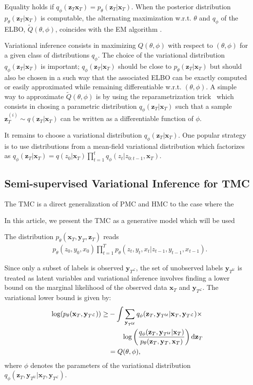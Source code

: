 \documentclass{article}
\def\x{{\mathbf x}}
\def\z{{\mathbf z}}
\def\y{{\mathbf y}}
\def\yl{{\mathbf y}_{T^{\mathcal{L}}}}
\def\yu{{\mathbf y}_{T^{\mathcal{U}}}}
\def\p{p_{\theta}}
\def\q{q_\phi}
\def\Q{\tilde{Q}}
\newcommand{\katy}[1]{\todo[size=\tiny,color=pink]{#1  \hfill --- Kat}}
\begin{document}
Equality holds if $\q(\z_T\x_T)= \p(\z_T|\x_T)$.
When the posterior distribution $\p(\z_T|\x_T)$ is  computable, the alternating 
maximization w.r.t. $\theta$ and $\q$  of the ELBO, $\Q(\theta,\phi)$,
coincides with the EM algorithm \cite{variational-EM}. 

Variational inference consists in maximizing $Q(\theta,\phi)$ 
with respect to $(\theta,\phi)$ for a given class of distributions $\q$. 
The choice of the variational distribution $\q(\z_T|\x_T)$ is important; 
$\q(\z_T|\x_T)$ should be close to $\p(\z_T|\x_T)$ but should also
be chosen in a such way that the associated ELBO can be exactly computed or 
easily approximated while remaining differentiable w.r.t. $(\theta,\phi)$. 
A simple way to approximate $\Q(\theta,\phi)$ is by using the reparametrization 
trick~\cite{kingma2013auto} which consists in chosing a parametric
distribution $\q(\z_T|\x_T)$ such that a sample $\z_T^{(i)} \sim q(\z_T|\x_T)$ can
be written as a differentiable function of $\phi$.

It remains to choose a variational distribution $\q(\z_T|\x_T)$.
One popular strategy is to use distributions from a mean-field variational 
distribution which factorizes as  $\q(\z_T|\x_T)=q(z_0|\x_T) \prod_{t=1}^t
\q(z_t|z_{0:t-1},\x_T)$.

\subsection{Semi-supervised Variational Inference for TMC}
\label{subsec:vi_tmc}

The TMC  is a direct generalization of PMC and HMC to the case where the

In this article, we present the TMC as a generative model which will be used 

The distribution $p_{\theta}(\x_T, \y_T, \z_T)$ reads
\begin{align}
\label{eq:TMC}
&p_{\theta}(z_0,y_0, x_0) \prod_{t=1}^T  p_{\theta}(z_t, y_t, x_t|z_{t-1},y_{t-1}, x_{t-1})   \text{.}
\end{align}


Since  only a subset of labels is observed $\yl$, the set of unobserved 
labels $\yu$ is treated as latent variables and variational inference 
involves finding a lower bound on the marginal likelihood of the observed data $\x_T$ and $\yl$.
The variational lower bound is given by: 
\begin{align}
    \label{eq:elbo_semi_tmc}
    \log(\p(\x_T, \yl) )   \geq  & -  \int \sum_{\yu}  \q(\z_T, \yu|\x_T, \yl) \times \nonumber \\ 
    & \quad \quad  \log \left(\frac{\q(\z_T,\yu  |\x_T)}{\p(\z_T,\y_T, \x_T)}\right)  {\rm d} \z_T \nonumber \\
    & =  Q(\theta,\phi) \text{,}  
\end{align}
where $\phi$ denotes the parameters of the variational distribution 
$\q(\z_T,\yu|\x_T, \yl)$.
\end{document}
